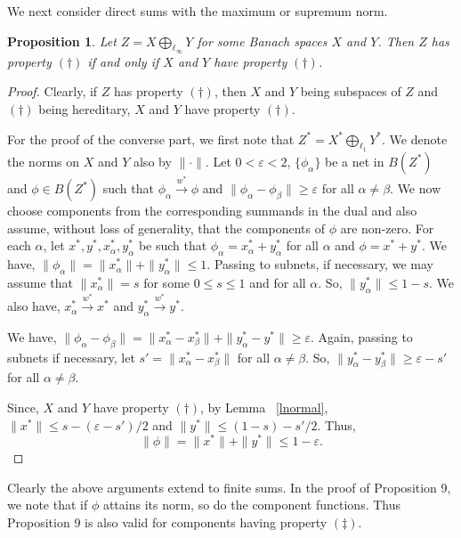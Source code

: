 \documentclass[11pt]{amsart}
\newcommand{\e}{\varepsilon}
\newtheorem{prop}[thm]{Proposition}
\begin{document}
We next consider direct sums with the maximum or supremum norm.
\begin{prop} \label{tstab}
	Let $Z = X \bigoplus_{\ell_\infty} Y$ for some Banach spaces $X$ and $Y$. Then $Z$ has property $(\dagger)$ if and only if $X$ and $Y$ have property $(\dagger)$.
\end{prop}

\begin{proof}
	Clearly, if $Z$ has property $(\dagger)$, then $X$ and $Y$ being subspaces of $Z$ and $(\dagger)$ being hereditary,	$X$ and $Y$ have property $(\dagger)$.
	
	For the proof of the converse part, we first note that $Z^* = X^* \bigoplus_{\ell_1} Y^*$.
	We denote the norms on $X$ and $Y$ also by $\|\cdot\|$.
	Let $0 <\e <2$, $\{\phi_{\alpha}\}$ be a net in $B(Z^*)$ and $\phi \in B(Z^*)$ such that $\phi_{\alpha} \xrightarrow{w^\ast} \phi$ and $\|\phi_{\alpha}-\phi_{\beta}\| \geq \e$ for all $\alpha \neq \beta$. We now choose components from the corresponding summands in the dual and also assume, without loss of generality, that the components of $\phi$ are non-zero. For each $\alpha$, let $x^*,y^*,x_{\alpha}^*, y_{\alpha}^*$ be such that $\phi_{\alpha}=x_{\alpha}^* + y_{\alpha}^*$ for all $\alpha$ and $\phi=x^* + y^*$. We have, $\|\phi_\alpha\| = \|x_{\alpha}^*\|+\|y_{\alpha}^*\| \leq 1$. Passing to subnets, if necessary, we may assume that $\|x_{\alpha}^*\|=s$ for some $0 \leq s \leq 1$ and for all $\alpha$. So, $\|y_{\alpha}^*\| \leq 1-s$. We also have, $x_\alpha^* \xrightarrow{w^\ast} x^*$ and $y_\alpha^* \xrightarrow{w^*} y^*$.
	
	We have, $\|\phi_\alpha - \phi_\beta\|=\|x_\alpha^*-x_\beta^*\| + \|y_\alpha^*-y^*\| \geq \e$. Again, passing to subnets if necessary, let $s'=\|x_\alpha^*-x_\beta^*\|$ for all $\alpha \neq \beta$. So, $\|y_\alpha^*-y_\beta^*\| \geq \e-s'$ for all $\alpha \neq \beta$.
	
	Since, $X$ and $Y$ have property $(\dagger)$, by Lemma ~\ref{lnormal},
	$\|x^*\| \leq s - (\e-s')/2$ and $\|y^*\| \leq (1-s) - s'/2$. Thus,
	\[
	\|\phi\|=\|x^*\| + \|y^*\| \leq 1 - \e.
	\]
\end{proof}

Clearly the above arguments extend to finite sums. In the proof of Proposition 9, we note that if $\phi$ attains its norm, so do the component functions. Thus Proposition 9 is also valid for components having property $(\ddag)$. 
\end{document}
